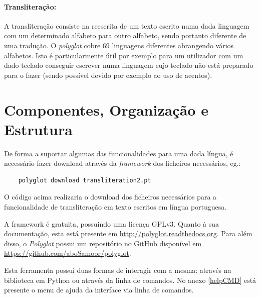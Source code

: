 \documentclass{article}
\begin{document}
\paragraph{Transliteração:} A transliteração consiste na reescrita de um texto escrito numa dada linguagem com um determinado alfabeto para outro alfabeto, sendo portanto diferente de uma tradução. O \textit{polyglot} cobre 69 linguagens diferentes abrangendo vários alfabetos. Isto é particularmente útil por exemplo para um utilizador com um dado teclado conseguir escrever numa linguagem cujo teclado não está preparado para o fazer (sendo possível devido por exemplo ao uso de acentos)\cite{translit}. 


\section{Componentes, Organização e Estrutura}
\qquad
De forma a suportar algumas das funcionalidades para uma dada língua, é necessário fazer download através da \textit{framework} dos ficheiros necessários, eg.:
\begin{verbatim}
    polyglot download transliteration2.pt
\end{verbatim}
O código acima realizaria o download dos ficheiros necessários para a funcionalidade de transliteração em texto escritos em língua portuguesa.

A framework é gratuita, possuindo uma licença GPLv3. Quanto à sua documentação, esta está presente em \url{http://polyglot.readthedocs.org}. Para além disso, o \textit{Polyglot} possui um repositório no GitHub disponível em  \url{https://github.com/aboSamoor/polyglot}.

Esta ferramenta possui duas formas de interagir com a mesma: através na biblioteca em Python ou através da linha de comandos. No anexo \ref{helpCMD} está presente o menu de ajuda da interface via linha de comandos.
\end{document}
